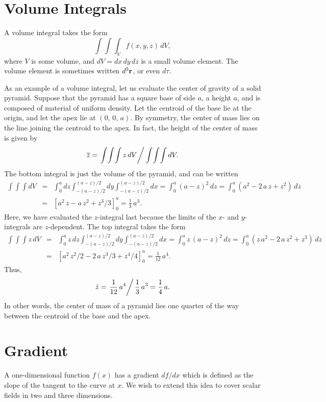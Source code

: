 \section{Volume Integrals}
A volume integral takes the form
\begin{equation}
\int\!\int\!\int_V f(x,y,z)\,dV,
\end{equation}
where $V$ is some volume, and $dV = dx \,dy \,dz$ is a small volume element. The
volume element is sometimes written $d^3{\bf r}$, or even $d\tau$. 

As an example
of a volume integral, let us evaluate the center of gravity of a solid pyramid. Suppose that
the pyramid has a square base of side $a$, a  height $a$, and is composed of material of uniform density. Let the centroid of the base lie at the origin, and let
the apex lie at $(0,\,0,\,a)$. 
By symmetry, the center of mass lies on the line joining the centroid  to the apex. 
In fact, the height of the center of mass is given by
\begin{equation}
\overline{z} = \left. \int\!\int\!\int z\,dV\right/ \int\!\int\!\int dV.
\end{equation}
The bottom integral is  just the volume of the pyramid, and can be written
\begin{eqnarray}
\int\!\int\!\int dV &=& \int_0^a dz \int_{-(a-z)/2}^{(a-z)/2} dy\int_{-(a-z)/2}^{(a-z)/2} dx = \int_0^a (a-z)^2\,dz=\int_0^a (a^2-2\,a\,z+z^2)\,dz\nonumber\\[0.5ex]
& =& \left[a^2\,z-a\,z^2+z^3/3\right]_0^a= \frac{1}{3}\,a^3.
\end{eqnarray}
Here, we have evaluated the $z$-integral last because the limits of the $x$- and $y$- integrals are $z$-dependent. 
The top integral takes the form
\begin{eqnarray}
\int\!\int\!\int z\,dV &=& \int_0^a z\,dz \int_{-(a-z)/2}^{(a-z)/2} dy\int_{-(a-z)/2}^{(a-z)/2} dx = \int_0^a z\,(a-z)^2\,dz=\int_0^a (z\,a^2-2\,a\,z^2+z^3)\,dz\nonumber\\[0.5ex]
& =& \left[a^2\,z^2/2-2\,a\,z^3/3+z^4/4\right]_0^a= \frac{1}{12}\,a^4.
\end{eqnarray}
Thus,
\begin{equation}
\bar{z} = \left.\frac{1}{12}\,a^4\right/\frac{1}{3}\,a^3 = \frac{1}{4}\,a.
\end{equation}
In other words, the center of mass of a pyramid lies one quarter of the way between the centroid of the base and the apex. 


\section{Gradient}\label{sgrad}
A one-dimensional function $f(x)$ has a  gradient $df/dx$ which is
defined as the slope of the tangent to the curve at $x$. 
We wish to extend this idea to cover scalar fields in two and three dimensions. 

